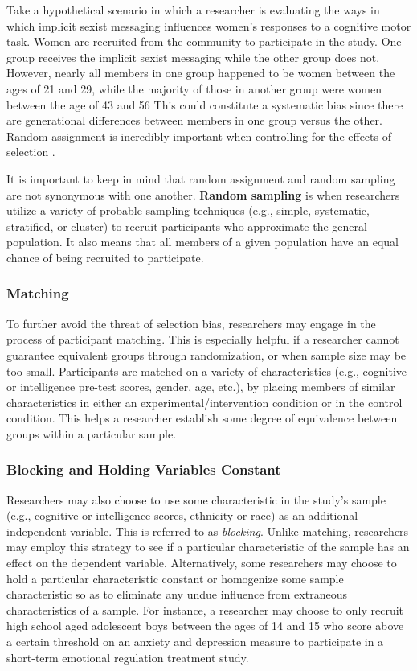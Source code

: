 \documentclass[
  11pt,
]{book}
\begin{document}
Take a hypothetical scenario in which a researcher is evaluating the ways in which implicit sexist messaging influences women's responses to a cognitive motor task. Women are recruited from the community to participate in the study. One group receives the implicit sexist messaging while the other group does not. However, nearly all members in one group happened to be women between the ages of 21 and 29, while the majority of those in another group were women between the age of 43 and 56 This could constitute a systematic bias since there are generational differences between members in one group versus the other. Random assignment is incredibly important when controlling for the effects of selection \citep{campbell_experimental_1963, cook_quasi-experimentation_1979, shadish_experimental_2002}.

It is important to keep in mind that random assignment and random sampling are not synonymous with one another. \textbf{Random sampling} is when researchers utilize a variety of probable sampling techniques (e.g., simple, systematic, stratified, or cluster) to recruit participants who approximate the general population. It also means that all members of a given population have an equal chance of being recruited to participate.

\subsubsection{Matching}\label{matching}

To further avoid the threat of selection bias, researchers may engage in the process of participant matching. This is especially helpful if a researcher cannot guarantee equivalent groups through randomization, or when sample size may be too small. Participants are matched on a variety of characteristics (e.g., cognitive or intelligence pre-test scores, gender, age, etc.), by placing members of similar characteristics in either an experimental/intervention condition or in the control condition. This helps a researcher establish some degree of equivalence between groups within a particular sample.

\subsubsection{Blocking and Holding Variables Constant}\label{blocking-and-holding-variables-constant}

Researchers may also choose to use some characteristic in the study's sample (e.g., cognitive or intelligence scores, ethnicity or race) as an additional independent variable. This is referred to as \emph{blocking}. Unlike matching, researchers may employ this strategy to see if a particular characteristic of the sample has an effect on the dependent variable. Alternatively, some researchers may choose to hold a particular characteristic constant or homogenize some sample characteristic so as to eliminate any undue influence from extraneous characteristics of a sample. For instance, a researcher may choose to only recruit high school aged adolescent boys between the ages of 14 and 15 who score above a certain threshold on an anxiety and depression measure to participate in a short-term emotional regulation treatment study.
\end{document}
